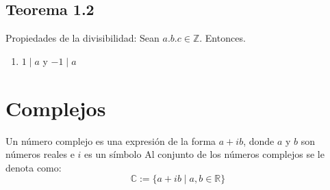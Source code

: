 \documentclass{article}
\begin{document}
    \subsection*{Teorema 1.2}
        Propiedades de la divisibilidad: Sean $a.b.c\in \mathbb{Z}$. Entonces.
            \begin{enumerate}[label=\roman*)]
                \item $1\mid a$ y $-1\mid a$
                
            \end{enumerate}

        

\newpage
\section{Complejos}

    Un número complejo es una expresión de la forma $a+ib$, donde $a$ y $b$ son números reales e $i$ es un símbolo
    Al conjunto de los números complejos se le denota como:
    $$
    \mathbb{C}:=\{a+i b \mid a, b \in \mathbb{R}\}
    $$
\end{document}
